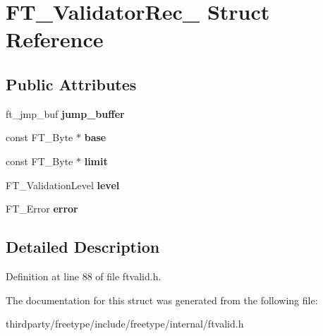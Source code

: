 \hypertarget{struct_f_t___validator_rec__}{}\section{F\+T\+\_\+\+Validator\+Rec\+\_\+ Struct Reference}
\label{struct_f_t___validator_rec__}
\subsection*{Public Attributes}
\begin{DoxyCompactItemize}
\item 
\mbox{\label{struct_f_t___validator_rec___aa0b346f9ef78939e93c85389aa2b54b3}} 
ft\+\_\+jmp\+\_\+buf {\bfseries jump\+\_\+buffer}
\item 
\mbox{\label{struct_f_t___validator_rec___a62de459b75acae3e1695b3d6600ca22f}} 
const F\+T\+\_\+\+Byte $\ast$ {\bfseries base}
\item 
\mbox{\label{struct_f_t___validator_rec___acc4d58a3e46d2b7c92bb51c3ddd8d331}} 
const F\+T\+\_\+\+Byte $\ast$ {\bfseries limit}
\item 
\mbox{\label{struct_f_t___validator_rec___aa70830280c76507b8b06e616da8cb545}} 
F\+T\+\_\+\+Validation\+Level {\bfseries level}
\item 
\mbox{\label{struct_f_t___validator_rec___ab12d54f54a55a90ce19761a1c24e28f0}} 
F\+T\+\_\+\+Error {\bfseries error}
\end{DoxyCompactItemize}


\subsection{Detailed Description}


Definition at line 88 of file ftvalid.\+h.



The documentation for this struct was generated from the following file\+:\begin{DoxyCompactItemize}
\item 
thirdparty/freetype/include/freetype/internal/ftvalid.\+h\end{DoxyCompactItemize}
